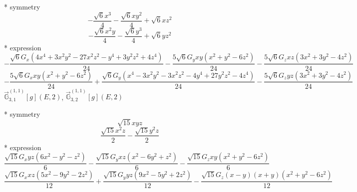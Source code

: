 \documentclass[fleqn,8pt]{jsarticle}
\begin{document}
\noindent\quad ** symmetry
\begin{dmath*}
- \frac{\sqrt{6} x^{3}}{4} - \frac{\sqrt{6} x y^{2}}{4} + \sqrt{6} x z^{2}
\end{dmath*}
\begin{dmath*}
- \frac{\sqrt{6} x^{2} y}{4} - \frac{\sqrt{6} y^{3}}{4} + \sqrt{6} y z^{2}
\end{dmath*}
\noindent\quad ** expression
\begin{dmath*}
- \frac{\sqrt{6} G_{x} \left(4 x^{4} + 3 x^{2} y^{2} - 27 x^{2} z^{2} - y^{4} + 3 y^{2} z^{2} + 4 z^{4}\right)}{24} - \frac{5 \sqrt{6} G_{y} x y \left(x^{2} + y^{2} - 6 z^{2}\right)}{24} - \frac{5 \sqrt{6} G_{z} x z \left(3 x^{2} + 3 y^{2} - 4 z^{2}\right)}{24}
\end{dmath*}
\begin{dmath*}
- \frac{5 \sqrt{6} G_{x} x y \left(x^{2} + y^{2} - 6 z^{2}\right)}{24} + \frac{\sqrt{6} G_{y} \left(x^{4} - 3 x^{2} y^{2} - 3 x^{2} z^{2} - 4 y^{4} + 27 y^{2} z^{2} - 4 z^{4}\right)}{24} - \frac{5 \sqrt{6} G_{z} y z \left(3 x^{2} + 3 y^{2} - 4 z^{2}\right)}{24}
\end{dmath*}
\noindent\quad $\vec{\mathbb{G}}_{3,1}^{(1,1)}[g](E,2)$, $\vec{\mathbb{G}}_{3,2}^{(1,1)}[g](E,2)$

\noindent\quad ** symmetry
\begin{dmath*}
\sqrt{15} x y z
\end{dmath*}
\begin{dmath*}
\frac{\sqrt{15} x^{2} z}{2} - \frac{\sqrt{15} y^{2} z}{2}
\end{dmath*}
\noindent\quad ** expression
\begin{dmath*}
\frac{\sqrt{15} G_{x} y z \left(6 x^{2} - y^{2} - z^{2}\right)}{6} - \frac{\sqrt{15} G_{y} x z \left(x^{2} - 6 y^{2} + z^{2}\right)}{6} - \frac{\sqrt{15} G_{z} x y \left(x^{2} + y^{2} - 6 z^{2}\right)}{6}
\end{dmath*}
\begin{dmath*}
\frac{\sqrt{15} G_{x} x z \left(5 x^{2} - 9 y^{2} - 2 z^{2}\right)}{12} + \frac{\sqrt{15} G_{y} y z \left(9 x^{2} - 5 y^{2} + 2 z^{2}\right)}{12} - \frac{\sqrt{15} G_{z} \left(x - y\right) \left(x + y\right) \left(x^{2} + y^{2} - 6 z^{2}\right)}{12}
\end{dmath*}
\end{document}
